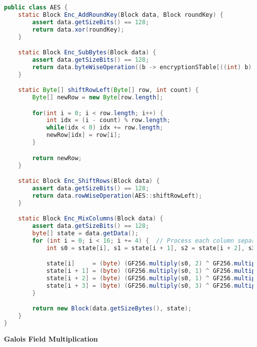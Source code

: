 \begin{lstlisting}[language=Java]
public class AES {
    static Block Enc_AddRoundKey(Block data, Block roundKey) {
        assert data.getSizeBits() == 128;
        return data.xor(roundKey);
    }

    static Block Enc_SubBytes(Block data) {
        assert data.getSizeBits() == 128;
        return data.byteWiseOperation((b -> encryptionSTable[((int) b) & 0xFF]));
    }

    static Byte[] shiftRowLeft(Byte[] row, int count) {
        Byte[] newRow = new Byte[row.length];

        for(int i = 0; i < row.length; i++) {
            int idx = (i - count) % row.length;
            while(idx < 0) idx += row.length;
            newRow[idx] = row[i];
        }

        return newRow;
    }

    static Block Enc_ShiftRows(Block data) {
        assert data.getSizeBits() == 128;
        return data.rowWiseOperation(AES::shiftRowLeft);
    }

    static Block Enc_MixColumns(Block data) {
        assert data.getSizeBits() == 128;
        byte[] state = data.getData();
        for (int i = 0; i < 16; i += 4) {  // Process each column separately
            int s0 = state[i], s1 = state[i + 1], s2 = state[i + 2], s3 = state[i + 3];

            state[i]     = (byte) (GF256.multiply(s0, 2) ^ GF256.multiply(s1, 3) ^ GF256.multiply(s2, 1) ^ GF256.multiply(s3, 1));
            state[i + 1] = (byte) (GF256.multiply(s0, 1) ^ GF256.multiply(s1, 2) ^ GF256.multiply(s2, 3) ^ GF256.multiply(s3, 1));
            state[i + 2] = (byte) (GF256.multiply(s0, 1) ^ GF256.multiply(s1, 1) ^ GF256.multiply(s2, 2) ^ GF256.multiply(s3, 3));
            state[i + 3] = (byte) (GF256.multiply(s0, 3) ^ GF256.multiply(s1, 1) ^ GF256.multiply(s2, 1) ^ GF256.multiply(s3, 2));
        }

        return new Block(data.getSizeBytes(), state);
    }
}
\end{lstlisting}

\textbf{Galois Field Multiplication}

